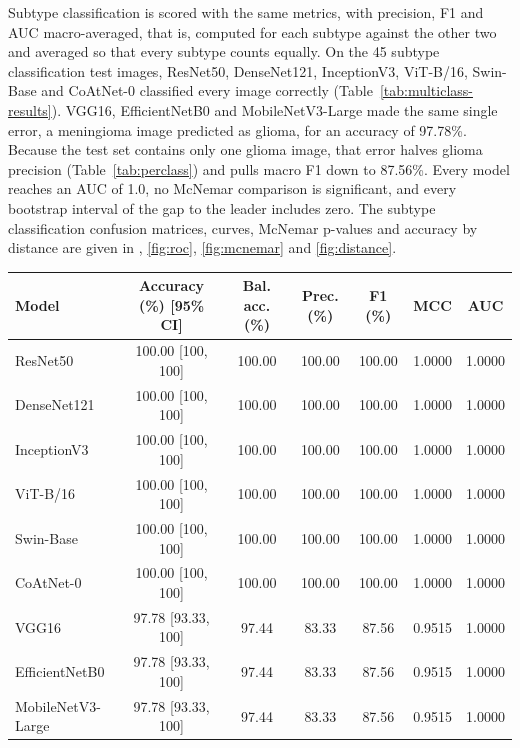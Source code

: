 \documentclass[a4paper,fleqn]{cas-sc}
\begin{document}
Subtype classification is scored with the same metrics, with precision, F1 and AUC macro-averaged, that is, computed for each subtype against the other two and averaged so that every subtype counts equally. On the 45 subtype classification test images, ResNet50, DenseNet121, InceptionV3, ViT-B/16, Swin-Base and CoAtNet-0 classified every image correctly (Table~\ref{tab:multiclass-results}). VGG16, EfficientNetB0 and MobileNetV3-Large made the same single error, a meningioma image predicted as glioma, for an accuracy of 97.78\%. Because the test set contains only one glioma image, that error halves glioma precision (Table~\ref{tab:perclass}) and pulls macro F1 down to 87.56\%. Every model reaches an AUC of 1.0, no McNemar comparison is significant, and every bootstrap interval of the gap to the leader includes zero. The subtype classification confusion matrices, curves, McNemar p-values and accuracy by distance are given in , \ref{fig:roc}, \ref{fig:mcnemar} and \ref{fig:distance}.

\begin{heretable}
\centering
\caption{Subtype classification: fold ensembles on the 45 held-out test images (1 glioma, 13 meningioma, 31 pituitary). Precision and F1 are macro-averaged, and AUC is the macro one-versus-rest value. Accuracy has a bootstrap 95\% confidence interval.}
\label{tab:multiclass-results}
\small
\begin{tabular*}{\textwidth}{@{\extracolsep{\fill}}lcccccc@{}}
\toprule
Model & Accuracy (\%) [95\% CI] & Bal. acc. (\%) & Prec. (\%) & F1 (\%) & MCC & AUC \\
\midrule
ResNet50 & 100.00 [100, 100] & 100.00 & 100.00 & 100.00 & 1.0000 & 1.0000 \\
DenseNet121 & 100.00 [100, 100] & 100.00 & 100.00 & 100.00 & 1.0000 & 1.0000 \\
InceptionV3 & 100.00 [100, 100] & 100.00 & 100.00 & 100.00 & 1.0000 & 1.0000 \\
ViT-B/16 & 100.00 [100, 100] & 100.00 & 100.00 & 100.00 & 1.0000 & 1.0000 \\
Swin-Base & 100.00 [100, 100] & 100.00 & 100.00 & 100.00 & 1.0000 & 1.0000 \\
CoAtNet-0 & 100.00 [100, 100] & 100.00 & 100.00 & 100.00 & 1.0000 & 1.0000 \\
VGG16 & 97.78 [93.33, 100] & 97.44 & 83.33 & 87.56 & 0.9515 & 1.0000 \\
EfficientNetB0 & 97.78 [93.33, 100] & 97.44 & 83.33 & 87.56 & 0.9515 & 1.0000 \\
MobileNetV3-Large & 97.78 [93.33, 100] & 97.44 & 83.33 & 87.56 & 0.9515 & 1.0000 \\
\bottomrule
\end{tabular*}
\end{heretable}
\end{document}
